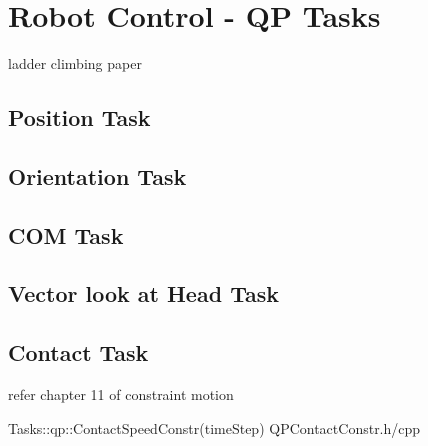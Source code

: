 \documentclass[a4paper, 12pt, oneside]{Thesis}  %
\begin{document}
\clearpage
\section{Robot Control - QP Tasks}\label{qpTasks}
ladder climbing paper~\cite{ladder-HRP-2Kai}

\subsection{Position Task}\label{positionTask}

\subsection{Orientation Task}\label{orientationTask}

\subsection{COM Task}\label{comTask}

\subsection{Vector look at Head Task}\label{HeadTask}

\subsection{Contact Task}\label{contact}
refer chapter 11 of \cite{featherstone2014rigid}
constraint motion

Tasks::qp::ContactSpeedConstr(timeStep)
QPContactConstr.h/cpp
\end{document}
